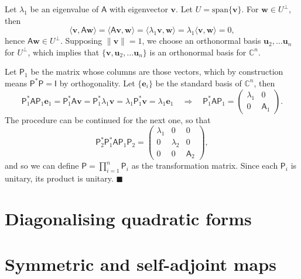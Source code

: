 \documentclass[letter-paper]{tufte-book}
\newenvironment{proof}[1][Proof]{\begin{trivlist}
\item[\hskip \labelsep {\bfseries #1}]}{\end{trivlist}}
\newcommand{\inner}[2]{\langle #1, #2\rangle}
\newcommand{\As}{{\mathsf{A}}}
\newcommand{\Is}{{\mathsf{I}}}
\newcommand{\Ps}{{\mathsf{P}}}
\newcommand{\eb}{{\boldsymbol{e}}}
\newcommand{\ub}{{\boldsymbol{u}}}
\newcommand{\vb}{{\boldsymbol{v}}}
\newcommand{\wb}{{\boldsymbol{w}}}
\newcommand{\qed}{\hfill$\blacksquare$}
\begin{document}
\begin{proof}
  Let $\lambda_1$ be an eigenvalue of $\As$ with eigenvector $\vb$. Let $U =
  \mbox{span}\{\vb\}$. For $\wb \in U^\perp$, then
  \begin{equation*}
    \inner{\vb}{\As \wb} = \inner{\As \vb}{\wb} = \inner{\lambda_1\vb}{\wb} = \lambda_1\inner{\vb}{\wb} = 0,
  \end{equation*}
  hence $\As \wb \in U^\perp$. Supposing $\|\vb\|=1$, we choose an orthonormal
  basis $\ub_2, \ldots \ub_n$ for $U^\perp$, which implies that $\{\vb, \ub_2,
  \ldots \ub_n\}$ is an orthonormal basis for $\mathbb{C}^n$. 
  
  Let $\Ps_1$ be the matrix whose columns are those vectors, which by
  construction means $\Ps^* \Ps = \Is$ by orthogonality. Let $\{\eb_i\}$ be the
  standard basis of $\mathbb{C}^n$, then
  \begin{equation*}
    \Ps_1^* \As \Ps_1 \eb_1 = \Ps_1^* \As \vb = \Ps_1^* \lambda_1 \vb = \lambda_1 \Ps_1^* \vb = \lambda_1 \eb_1 \quad \Rightarrow \quad \Ps_1^* \As \Ps_1 = \begin{pmatrix}\lambda_1 & 0 \\ 0 & \As_1\end{pmatrix}.
  \end{equation*}
  The procedure can be continued for the next one, so that
  \begin{equation*}
    \Ps_2^* \Ps_1^* \As \Ps_1 \Ps_2 = \begin{pmatrix}\lambda_1 & 0 & 0 \\ 0 & \lambda_2 & 0 \\ 0 & 0 & \As_2\end{pmatrix},
  \end{equation*}
  and so we can define $\mathsf{P} = \prod_{i=1}^n \Ps_i$ as the transformation
  matrix. Since each $\Ps_i$ is unitary, its product is unitary. \qed
\end{proof}


\section{Diagonalising quadratic forms}


\section{Symmetric and self-adjoint maps}
\end{document}
